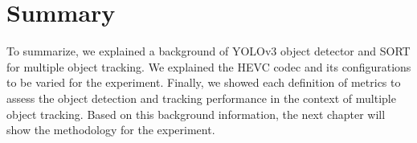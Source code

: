 \section{Summary}
\label{sec:background/summary}

To summarize, we explained a background of YOLOv3 object detector and SORT for multiple object tracking. We explained the HEVC codec and its configurations to be varied for the experiment. Finally, we showed each definition of metrics to assess the object detection and tracking performance in the context of multiple object tracking. Based on this background information, the next chapter will show the methodology for the experiment.